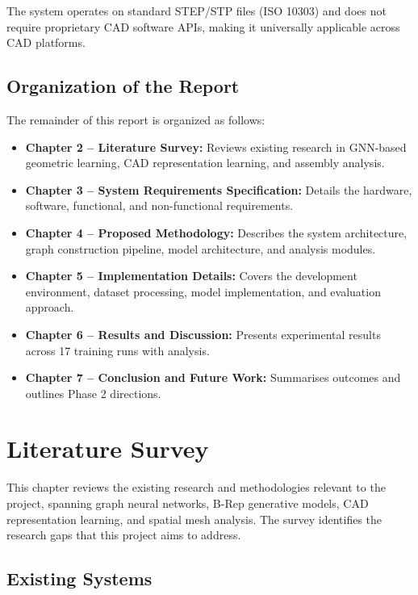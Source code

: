 \documentclass[12pt]{report}
\begin{document}
The system operates on standard STEP/STP files (ISO 10303) and does not require proprietary CAD software APIs, making it universally applicable across CAD platforms.

\section{Organization of the Report}

The remainder of this report is organized as follows:

\begin{itemize}
    \item \textbf{Chapter 2 -- Literature Survey:} Reviews existing research in GNN-based geometric learning, CAD representation learning, and assembly analysis.
    \item \textbf{Chapter 3 -- System Requirements Specification:} Details the hardware, software, functional, and non-functional requirements.
    \item \textbf{Chapter 4 -- Proposed Methodology:} Describes the system architecture, graph construction pipeline, model architecture, and analysis modules.
    \item \textbf{Chapter 5 -- Implementation Details:} Covers the development environment, dataset processing, model implementation, and evaluation approach.
    \item \textbf{Chapter 6 -- Results and Discussion:} Presents experimental results across 17 training runs with analysis.
    \item \textbf{Chapter 7 -- Conclusion and Future Work:} Summarises outcomes and outlines Phase 2 directions.
\end{itemize}

\newpage

\chapter{Literature Survey}

This chapter reviews the existing research and methodologies relevant to the project, spanning graph neural networks, B-Rep generative models, CAD representation learning, and spatial mesh analysis. The survey identifies the research gaps that this project aims to address.

\section{Existing Systems}
\end{document}
